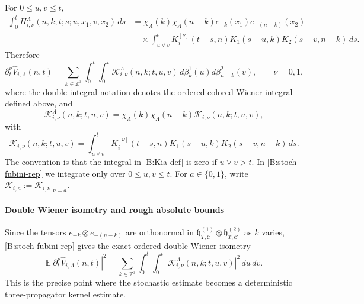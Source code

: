 \documentclass[10pt]{amsart}
\numberwithin{equation}{section}
\theoremstyle{plain}
\theoremstyle{definition}
\theoremstyle{remark}
\newcommand{\Z}{\mathbb{Z}}
\newcommand{\E}{\mathbb{E}}
\newcommand{\C}{\mathcal{C}}
\newcommand{\calK}{\mathcal{K}}
\begin{document}
For \(0\le u,v\le t\),
\[
\begin{aligned}
        \int_0^t H_{i,\nu}^{\Lambda}(n,k;t;s;u,x_1,v,x_2)\,ds
        &=
        \chi_\Lambda(k)\chi_\Lambda(n-k)e_{-k}(x_1)e_{-(n-k)}(x_2) \\
        &\quad\times
        \int_{u\vee v}^tK_i^{[\nu]}(t-s,n)K_1(s-u,k)K_2(s-v,n-k)\,ds.
\end{aligned}
\]
Therefore
\begin{equation}\label{B:stoch-fubini-rep}
        \partial_t^\nu\widehat V_{i,\Lambda}(n,t)
        =
        \sum_{k\in\Z^3}
        \int_0^t\int_0^t
        \calK_{i,\nu}^{\Lambda}(n,k;t,u,v)
        \,d\beta_k^1(u)d\beta_{n-k}^2(v),
        \qquad \nu=0,1,
\end{equation}
where the double-integral notation denotes the ordered colored Wiener integral defined above, and
\[
        \calK_{i,\nu}^{\Lambda}(n,k;t,u,v)
        =
        \chi_\Lambda(k)\chi_\Lambda(n-k)\calK_{i,\nu}(n,k;t,u,v),
\]
with
\begin{equation}\label{B:Kia-def}
        \calK_{i,\nu}(n,k;t,u,v)
        =
        \int_{u\vee v}^tK_i^{[\nu]}(t-s,n)K_1(s-u,k)K_2(s-v,n-k)\,ds.
\end{equation}
The convention is that the integral in \eqref{B:Kia-def} is zero if \(u\vee v>t\).  In \eqref{B:stoch-fubini-rep} we integrate only over \(0\le u,v\le t\).  For \(a\in\{0,1\}\), write \(\calK_{i,a}:=\calK_{i,\nu}|_{\nu=a}\).

\paragraph{Double Wiener isometry and rough absolute bounds}

Since the tensors \(e_{-k}\otimes e_{-(n-k)}\) are orthonormal in \(\mathfrak h_{T,\C}^{(1)}\otimes\mathfrak h_{T,\C}^{(2)}\) as \(k\) varies, \eqref{B:stoch-fubini-rep} gives the exact ordered double-Wiener isometry
\begin{equation}\label{B:double-isometry}
        \E\left|\partial_t^\nu\widehat V_{i,\Lambda}(n,t)\right|^2
        =
        \sum_{k\in\Z^3}\int_0^t\int_0^t
        \left|\calK_{i,\nu}^{\Lambda}(n,k;t,u,v)\right|^2\,du\,dv.
\end{equation}
This is the precise point where the stochastic estimate becomes a deterministic three-propagator kernel estimate.
\end{document}
